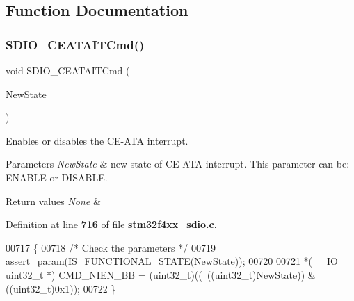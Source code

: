 \subsection{Function Documentation}
\mbox{\label{group__SDIO__Group5_gab44b8cbc21be000a291563076159503b}} 
\subsubsection{S\+D\+I\+O\+\_\+\+C\+E\+A\+T\+A\+I\+T\+Cmd()}
{\footnotesize\ttfamily void S\+D\+I\+O\+\_\+\+C\+E\+A\+T\+A\+I\+T\+Cmd (\begin{DoxyParamCaption}\item[{\textbf{ Functional\+State}}]{New\+State }\end{DoxyParamCaption})}



Enables or disables the C\+E-\/\+A\+TA interrupt. 


\begin{DoxyParams}{Parameters}
{\em New\+State} & new state of C\+E-\/\+A\+TA interrupt. This parameter can be\+: E\+N\+A\+B\+LE or D\+I\+S\+A\+B\+LE. \\
\hline
\end{DoxyParams}

\begin{DoxyRetVals}{Return values}
{\em None} & \\
\hline
\end{DoxyRetVals}


Definition at line \textbf{ 716} of file \textbf{ stm32f4xx\+\_\+sdio.\+c}.


\begin{DoxyCode}
00717 \{ 
00718   \textcolor{comment}{/* Check the parameters */}
00719   assert_param(IS_FUNCTIONAL_STATE(NewState));
00720   
00721   *(\_\_IO uint32\_t *) CMD_NIEN_BB = (uint32\_t)((~((uint32\_t)NewState)) & ((uint32\_t)0x1));
00722 \}
\end{DoxyCode}
\mbox{\label{group__SDIO__Group5_ga1bbe98c629812bc62121d9c8b2c5e21b}} 
